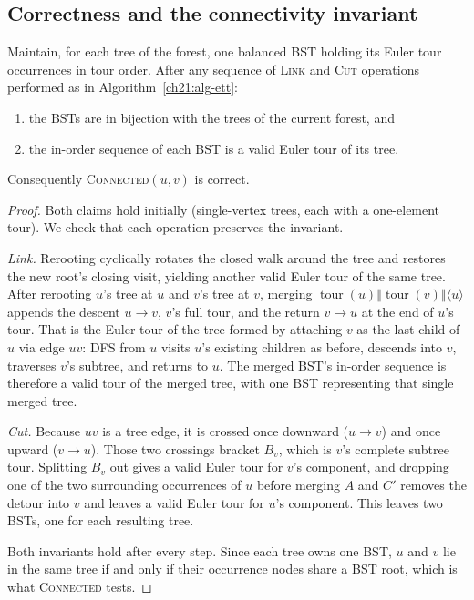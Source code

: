 \subsection{Correctness and the connectivity invariant}

\begin{theorem}
\label{ch21:thm-ett}
Maintain, for each tree of the forest, one balanced BST holding its Euler tour
occurrences in tour order. After any sequence of \textsc{Link} and \textsc{Cut}
operations performed as in Algorithm~\ref{ch21:alg-ett}:
\begin{enumerate}
\item the BSTs are in bijection with the trees of the current forest, and
\item the in-order sequence of each BST is a valid Euler tour of its tree.
\end{enumerate}
Consequently \textsc{Connected}$(u,v)$ is correct.
\end{theorem}

\begin{proof}
Both claims hold initially (single-vertex trees, each with a one-element tour). We check that each operation
preserves the invariant.

\emph{Link.} Rerooting cyclically rotates the closed walk around the tree and restores the new root's closing visit, yielding another valid Euler tour of the same tree.
After rerooting $u$'s tree at $u$ and $v$'s tree at $v$, merging $\operatorname{tour}(u)\mathbin{\Vert}\operatorname{tour}(v)\mathbin{\Vert}\langle u\rangle$ appends the descent $u\!\to\!v$, $v$'s full tour, and the return $v\!\to\!u$ at the
end of $u$'s tour. That is the Euler tour of the tree formed by attaching
$v$ as the last child of $u$ via edge $uv$: DFS from $u$ visits $u$'s existing children as before, descends into $v$, traverses $v$'s subtree, and returns to $u$. The merged BST's in-order sequence is therefore a valid tour of
the merged tree, with one BST representing that single merged tree.

\emph{Cut.} Because $uv$ is a tree edge, it is crossed once downward ($u\!\to\!v$) and once upward ($v\!\to\!u$). Those two crossings bracket $B_v$, which is $v$'s complete subtree tour. Splitting $B_v$ out gives a valid Euler tour for $v$'s component, and dropping one of the two surrounding occurrences of $u$ before merging $A$ and $C'$ removes the detour into $v$ and leaves a valid Euler tour for $u$'s component. This leaves two BSTs, one for each resulting tree.

Both invariants hold after every step. Since each tree owns one BST,
$u$ and $v$ lie in the same tree if and only if their occurrence nodes share a BST root, which is what
\textsc{Connected} tests.
\end{proof}

